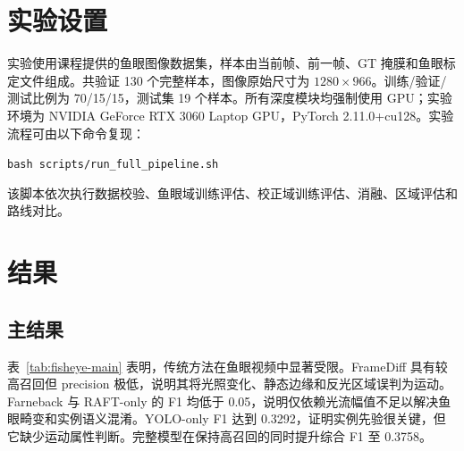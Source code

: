 \documentclass[10pt,twocolumn]{article}
\begin{document}
\section{{\cjkfont 实验设置}}
{\cjkfont 实验使用课程提供的鱼眼图像数据集，样本由当前帧、前一帧、}GT {\cjkfont 掩膜和鱼眼标定文件组成。共验证} 130 {\cjkfont 个完整样本，图像原始尺寸为} $1280\times966${\cjkfont 。训练}/{\cjkfont 验证}/{\cjkfont 测试比例为} 70/15/15{\cjkfont ，测试集} 19 {\cjkfont 个样本。所有深度模块均强制使用} GPU{\cjkfont ；实验环境为} NVIDIA GeForce RTX 3060 Laptop GPU{\cjkfont ，}PyTorch 2.11.0+cu128{\cjkfont 。实验流程可由以下命令复现：}
\begin{center}
\small\texttt{bash scripts/run\_full\_pipeline.sh}
\end{center}
{\cjkfont 该脚本依次执行数据校验、鱼眼域训练评估、校正域训练评估、消融、区域评估和路线对比。}

\section{{\cjkfont 结果}}
\subsection{{\cjkfont 主结果}}
\begin{table}[t]
\centering
\caption{{\cjkfont 原始鱼眼域测试集主结果。表中数值为固定测试集上的平均指标。}}
\label{tab:fisheye-main}
\end{table}

{\cjkfont 表}~\ref{tab:fisheye-main} {\cjkfont 表明，传统方法在鱼眼视频中显著受限。}FrameDiff {\cjkfont 具有较高召回但} precision {\cjkfont 极低，说明其将光照变化、静态边缘和反光区域误判为运动。}Farneback {\cjkfont 与} RAFT-only {\cjkfont 的} F1 {\cjkfont 均低于} 0.05{\cjkfont ，说明仅依赖光流幅值不足以解决鱼眼畸变和实例语义混淆。}YOLO-only F1 {\cjkfont 达到} 0.3292{\cjkfont ，证明实例先验很关键，但它缺少运动属性判断。完整模型在保持高召回的同时提升综合} F1 {\cjkfont 至} 0.3758{\cjkfont 。}
\end{document}
